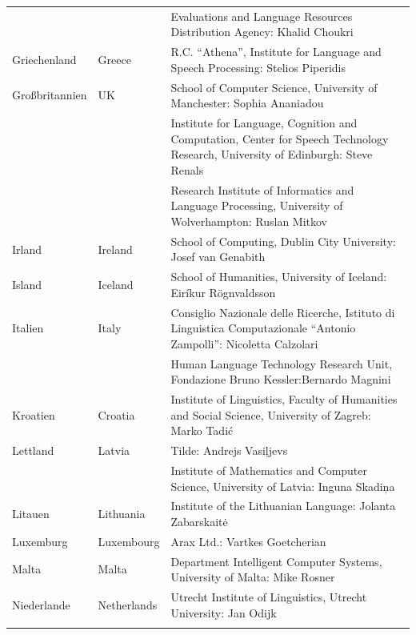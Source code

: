 \begin{longtable}{@{}llp{113mm}@{}}
  & & Evaluations and Language Resources Distribution Agency: Khalid Choukri\\ \addlinespace 
  Griechenland & \textcolor{grey1}{Greece} & R.C. “Athena”, Institute for Language and Speech Processing: Stelios Piperidis\\ \addlinespace
  Großbritannien & \textcolor{grey1}{UK} & 
  School of Computer Science, University of Manchester: Sophia Ananiadou \\ \addlinespace 
  & & Institute for Language, Cognition and Computation, Center for Speech Technology Research, University of Edinburgh: Steve Renals \\ \addlinespace 
  & & Research Institute of Informatics and Language Processing, University of Wolverhampton: Ruslan Mitkov \\ \addlinespace 
  Irland & \textcolor{grey1}{Ireland} & School of Computing, Dublin City University: Josef van Genabith\\ \addlinespace
  Island & \textcolor{grey1}{Iceland} & School of Humanities, University of Iceland: Eiríkur Rögnvaldsson\\ \addlinespace
  Italien & \textcolor{grey1}{Italy} & Consiglio Nazionale delle Ricerche, Istituto di Linguistica Computazionale “Antonio Zampolli”: Nicoletta Calzolari\\ \addlinespace
  & & Human Language Technology Research Unit, Fondazione Bruno Kessler:\newline Bernardo Magnini\\ \addlinespace 
  Kroatien & \textcolor{grey1}{Croatia} & Institute of Linguistics, Faculty of Humanities and Social Science, University of Zagreb: Marko Tadić \\ \addlinespace
  Lettland & \textcolor{grey1}{Latvia} & Tilde: Andrejs Vasiļjevs\\ \addlinespace 
  & & Institute of Mathematics and Computer Science, University of Latvia: Inguna Skadiņa\\ \addlinespace
  Litauen & \textcolor{grey1}{Lithuania} & Institute of the Lithuanian Language: Jolanta Zabarskaitė\\ \addlinespace
  Luxemburg & \textcolor{grey1}{Luxembourg} & Arax Ltd.: Vartkes Goetcherian\\ \addlinespace
  Malta & \textcolor{grey1}{Malta} & Department Intelligent Computer Systems, University of Malta: Mike Rosner\\ \addlinespace
  Niederlande & \textcolor{grey1}{Netherlands} & Utrecht Institute of Linguistics, Utrecht University: Jan Odijk\\ \addlinespace 

\end{longtable}
